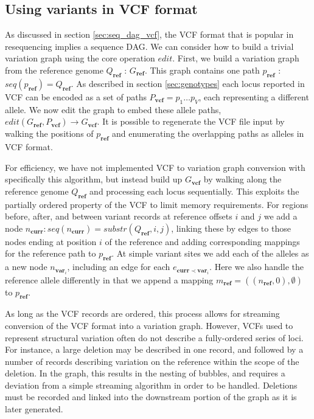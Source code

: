 \documentclass[a4paper,12pt,numbered,oneside]{Classes/PhDThesisPSnPDF}
\begin{document}
\subsection{Using variants in VCF format}
As discussed in section \ref{sec:seq_dag_vcf}, the VCF format that is popular in resequencing implies a sequence DAG.
We can consider how to build a trivial variation graph using the core operation $edit$.
First, we build a variation graph from the reference genome $Q_\textbf{ref}$ : $G_\textbf{ref}$.
This graph contains one path $p_\textbf{ref}$ : $seq(p_\textbf{ref}) = Q_\textbf{ref}$.
As described in section \ref{sec:genotypes} each locus reported in VCF can be encoded as a set of paths $P_\textbf{vcf} = p_1 \ldots p_V$, each representing a different allele.
We now edit the graph to embed these allele paths, $edit(G_\textbf{ref}, P_\textbf{vcf}) \to G_\textbf{vcf}$.
It is possible to regenerate the VCF file input by walking the positions of $p_\textbf{ref}$ and enumerating the overlapping paths as alleles in VCF format.

For efficiency, we have not implemented VCF to variation graph conversion with specifically this algorithm, but instead build up $G_\textbf{vcf}$ by walking along the reference genome $Q_\textbf{ref}$ and processing each locus sequentially.
This exploits the partially ordered property of the VCF to limit memory requirements.
For regions before, after, and between variant records at reference offsets $i$ and $j$ we add a node $n_\textbf{curr} : seq(n_\textbf{curr}) = substr(Q_\textbf{ref}, i, j)$, linking these by edges to those nodes ending at position $i$ of the reference and adding corresponding mappings for the reference path to $p_\textbf{ref}$.
At simple variant sites we add each of the alleles as a new node $n_{\textbf{var}_i}$, including an edge for each $e_{\textbf{curr} \prec \textbf{var}_i}$.
Here we also handle the reference allele differently in that we append a mapping $m_\textbf{ref} = ((n_\textbf{ref}, 0), \emptyset)$ to $p_\textbf{ref}$.

As long as the VCF records are ordered, this process allows for streaming conversion of the VCF format into a variation graph.
However, VCFs used to represent structural variation often do not describe a fully-ordered series of loci.
For instance, a large deletion may be described in one record, and followed by a number of records describing variation on the reference within the scope of the deletion.
In the graph, this results in the nesting of bubbles, and requires a deviation from a simple streaming algorithm in order to be handled.
Deletions must be recorded and linked into the downstream portion of the graph as it is later generated.
\end{document}
